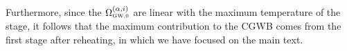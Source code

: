 \documentclass[a4paper,11pt]{article}
\newcommand{\tti}[1]{\text{\tiny{#1}}}
\begin{document}
Furthermore, since the $\Omega^{(\alpha,i)}_{\tti{GW,0}}$ are linear with the maximum temperature of the stage, it follows that the maximum contribution to the CGWB comes from the first stage after reheating, in which we have focused on the main text. 



\end{document}

